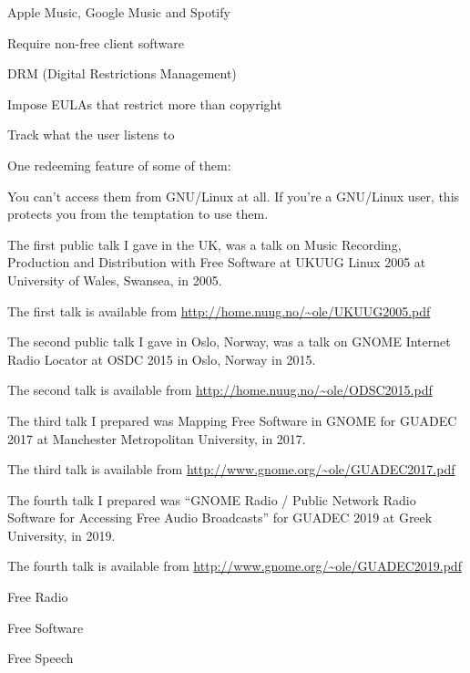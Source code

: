 \documentclass[20pt,landscape]{foils}
\begin{document}

\begin{list1}
\item Apple Music, Google Music and Spotify
  \begin{list2}
  \item Require non-free client software
  \item DRM (Digital Restrictions Management)
  \item Impose EULAs that restrict more than copyright
  \item Track what the user listens to
  \end{list2}
\end{list1}

One redeeming feature of some of them:

\begin{list2}
\item You can't access them from GNU/Linux at all.  If you're a GNU/Linux user, this protects you from the temptation to use them.
\end{list2}


The first public talk I gave in the UK, was a talk on Music Recording, Production and Distribution with Free Software at UKUUG Linux 2005 at University of Wales, Swansea, in 2005.

The first talk is available from \url{http://home.nuug.no/~ole/UKUUG2005.pdf}

The second public talk I gave in Oslo, Norway, was a talk on GNOME Internet Radio Locator at OSDC 2015 in Oslo, Norway in 2015.

The second talk is available from \url{http://home.nuug.no/~ole/ODSC2015.pdf}

The third talk I prepared was Mapping Free Software in GNOME for GUADEC 2017 at Manchester Metropolitan University, in 2017.

The third talk is available from \url{http://www.gnome.org/~ole/GUADEC2017.pdf}

The fourth talk I prepared was ``GNOME Radio / Public Network Radio Software for Accessing Free Audio Broadcasts'' for GUADEC 2019 at Greek University, in 2019.

The fourth talk is available from \url{http://www.gnome.org/~ole/GUADEC2019.pdf}

\begin{list1}
\item Free Radio
\item Free Software
\item Free Speech
\end{list1}
\end{document}

